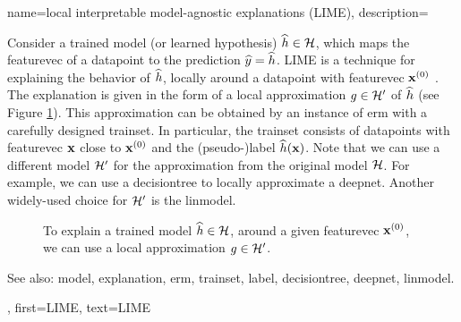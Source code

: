 {name={local interpretable model-agnostic explanations (LIME)},
	description={Consider 
		a trained \gls{model} (or learned \gls{hypothesis}) $\widehat{h} \in \mathcal{H}$, 
		which maps the \gls{featurevec} of a \gls{datapoint} to the \gls{prediction} $\widehat{y}= \widehat{h}$. 
		LIME is a technique for explaining the behavior of $\widehat{h}$, locally around a \gls{datapoint} with \gls{featurevec} ${\bf x}^{(0)}$ \cite{Ribeiro2016}. 
		The \gls{explanation} is given in the form of a local approximation $g \in \mathcal{H}'$ of $\widehat{h}$ 
		(see Figure \ref{fig_lime_dict}). This approximation can be obtained by an instance of \gls{erm} 
		with a carefully designed \gls{trainset}. In particular, the \gls{trainset} consists of \glspl{datapoint} 
		with \gls{featurevec} ${\bf x}$ close to ${\bf x}^{(0)}$ and the (pseudo-)\gls{label} $\widehat{h}({\bf x})$. 
		Note that we can use a different \gls{model} $\mathcal{H}'$ for the approximation from 
		the original \gls{model} $\mathcal{H}$. For example, we can use a \gls{decisiontree} 
		to locally approximate a \gls{deepnet}. Another widely-used choice for $\mathcal{H}'$ is 
		the \gls{linmodel}. 
		\begin{figure}[H]
		\begin{center}
		\end{center}
		\caption{To explain a trained \gls{model} $\widehat{h} \in \mathcal{H}$, around a 
		given \gls{featurevec} ${\bf x}^{(0)}$, we can use a local approximation $g \in \mathcal{H}'$. }
		\label{fig_lime_dict}
		\end{figure}
		See also: \gls{model}, \gls{explanation}, \gls{erm}, \gls{trainset}, \gls{label}, \gls{decisiontree}, \gls{deepnet}, \gls{linmodel}.},
	first={LIME},
	text={LIME}
}



